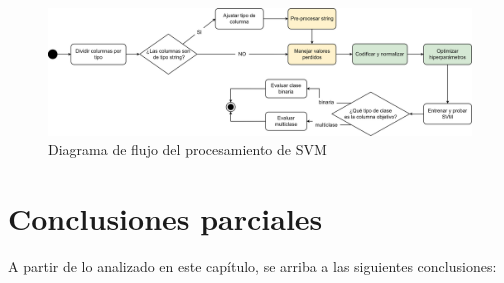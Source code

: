 \begin{figure}[H]
	\centering
	\includegraphics[width=1\linewidth]{"figuras/capi 2/modelos/procesado svm.drawio"}
	\caption{Diagrama de flujo del procesamiento de SVM}
	\label{fig:procesado-svm}
\end{figure}


\section{Conclusiones parciales}
A partir de lo analizado en este capítulo, se arriba a las siguientes conclusiones:
